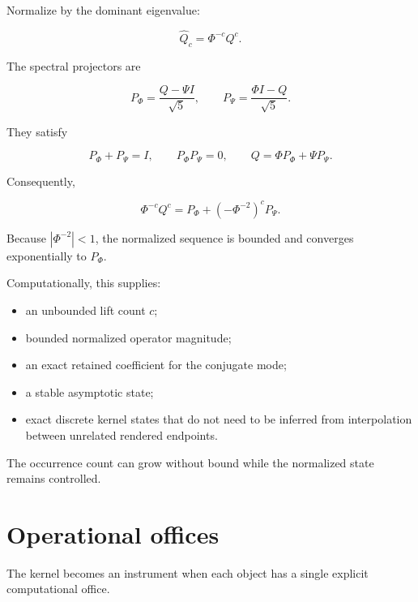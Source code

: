 \documentclass[11pt,letterpaper]{article}
\theoremstyle{clearonyx}
\begin{document}
Normalize by the dominant eigenvalue:

\begin{equation}
\widehat Q_c=\Phi^{-c}Q^c.
\end{equation}

The spectral projectors are

\begin{equation}
P_\Phi=\frac{Q-\Psi I}{\sqrt5},
\qquad
P_\Psi=\frac{\Phi I-Q}{\sqrt5}.
\end{equation}

They satisfy

\begin{equation}
P_\Phi+P_\Psi=I,
\qquad
P_\Phi P_\Psi=0,
\qquad
Q=\Phi P_\Phi+\Psi P_\Psi.
\end{equation}

Consequently,

\begin{equation}
\boxed{
\Phi^{-c}Q^c
=P_\Phi+\left(-\Phi^{-2}\right)^cP_\Psi.
}
\end{equation}

Because $|\Phi^{-2}|<1$, the normalized sequence is bounded and converges exponentially to $P_\Phi$.

Computationally, this supplies:

\begin{itemize}
  \item an unbounded lift count $c$;
  \item bounded normalized operator magnitude;
  \item an exact retained coefficient for the conjugate mode;
  \item a stable asymptotic state;
  \item exact discrete kernel states that do not need to be inferred from interpolation between unrelated rendered endpoints.
\end{itemize}

The occurrence count can grow without bound while the normalized state remains controlled.

\section{Operational offices}

The kernel becomes an instrument when each object has a single explicit computational office.
\end{document}
